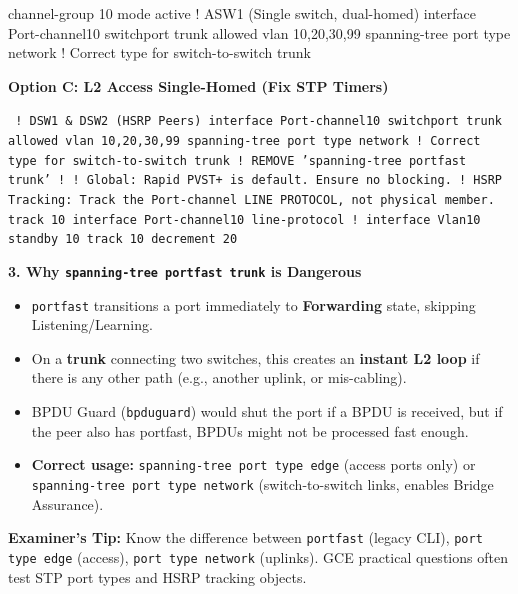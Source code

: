 \documentclass[11pt]{article}
\begin{document}
\begin{exoresolu}
\begin{flushleft}
{ channel-group 10 mode active\newline
\newline
! ASW1 (Single switch, dual-homed)\newline
interface Port-channel10\newline
 switchport trunk allowed vlan 10,20,30,99\newline
 spanning-tree port type network  ! Correct type for switch-to-switch trunk
}
\end{flushleft}
\textbf{Option C: L2 Access Single-Homed (Fix STP Timers)}
\begin{flushleft}
\texttt{
! DSW1 \& DSW2 (HSRP Peers)\newline
interface Port-channel10\newline
 switchport trunk allowed vlan 10,20,30,99\newline
 spanning-tree port type network  ! Correct type for switch-to-switch trunk\newline
! REMOVE 'spanning-tree portfast trunk'\newline
!\newline
! Global: Rapid PVST+ is default. Ensure no blocking.\newline
! HSRP Tracking: Track the Port-channel LINE PROTOCOL, not physical member.\newline
track 10 interface Port-channel10 line-protocol\newline
!\newline
interface Vlan10\newline
 standby 10 track 10 decrement 20
}
\end{flushleft}

\noindent\textbf{3. Why \texttt{spanning-tree portfast trunk} is Dangerous}
\begin{itemize}
    \item \texttt{portfast} transitions a port immediately to \textbf{Forwarding} state, skipping Listening/Learning.
    \item On a \textbf{trunk} connecting two switches, this creates an \textbf{instant L2 loop} if there is any other path (e.g., another uplink, or mis-cabling).
    \item BPDU Guard (\texttt{bpduguard}) would shut the port if a BPDU is received, but if the peer also has portfast, BPDUs might not be processed fast enough.
    \item \textbf{Correct usage:} \texttt{spanning-tree port type edge} (access ports only) or \texttt{spanning-tree port type network} (switch-to-switch links, enables Bridge Assurance).
\end{itemize}

\noindent\textbf{Examiner's Tip:} Know the difference between \texttt{portfast} (legacy CLI), \texttt{port type edge} (access), \texttt{port type network} (uplinks). GCE practical questions often test STP port types and HSRP tracking objects.
\end{exoresolu}
\end{document}
